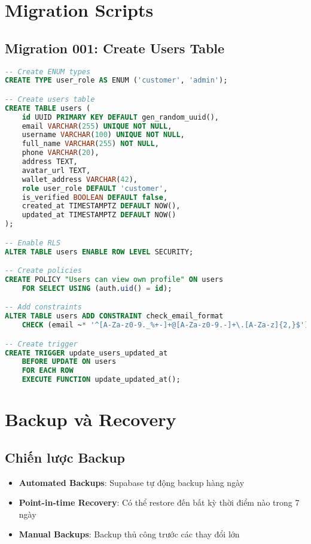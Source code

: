 \documentclass[12pt,a4paper]{article}
\begin{document}
\section{Migration Scripts}

\subsection{Migration 001: Create Users Table}
\begin{lstlisting}[language=SQL, caption=001\_create\_users\_table.sql]
-- Create ENUM types
CREATE TYPE user_role AS ENUM ('customer', 'admin');

-- Create users table
CREATE TABLE users (
    id UUID PRIMARY KEY DEFAULT gen_random_uuid(),
    email VARCHAR(255) UNIQUE NOT NULL,
    username VARCHAR(100) UNIQUE NOT NULL,
    full_name VARCHAR(255) NOT NULL,
    phone VARCHAR(20),
    address TEXT,
    avatar_url TEXT,
    wallet_address VARCHAR(42),
    role user_role DEFAULT 'customer',
    is_verified BOOLEAN DEFAULT false,
    created_at TIMESTAMPTZ DEFAULT NOW(),
    updated_at TIMESTAMPTZ DEFAULT NOW()
);

-- Enable RLS
ALTER TABLE users ENABLE ROW LEVEL SECURITY;

-- Create policies
CREATE POLICY "Users can view own profile" ON users
    FOR SELECT USING (auth.uid() = id);

-- Add constraints
ALTER TABLE users ADD CONSTRAINT check_email_format 
    CHECK (email ~* '^[A-Za-z0-9._%+-]+@[A-Za-z0-9.-]+\.[A-Za-z]{2,}$');

-- Create trigger
CREATE TRIGGER update_users_updated_at
    BEFORE UPDATE ON users
    FOR EACH ROW
    EXECUTE FUNCTION update_updated_at();
\end{lstlisting}

\section{Backup và Recovery}

\subsection{Chiến lược Backup}
\begin{itemize}
    \item \textbf{Automated Backups}: Supabase tự động backup hàng ngày
    \item \textbf{Point-in-time Recovery}: Có thể restore đến bất kỳ thời điểm nào trong 7 ngày
    \item \textbf{Manual Backups}: Backup thủ công trước các thay đổi lớn
\end{itemize}
\end{document}
